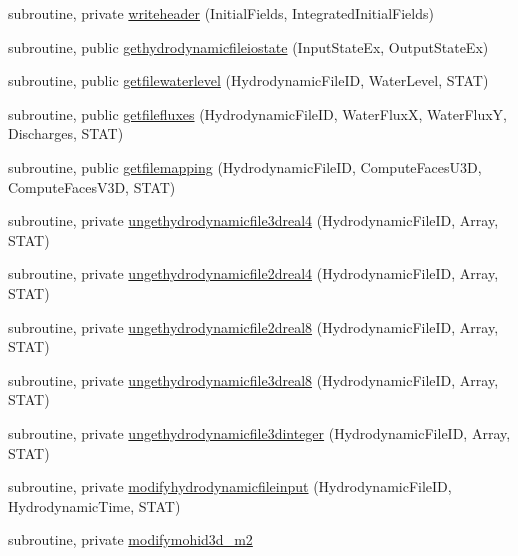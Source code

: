 \begin{DoxyCompactItemize}
\item 
subroutine, private \mbox{\hyperlink{namespacemodulehydrodynamicfile_ad777d9126fa56a82299811343a399ea8}{writeheader}} (Initial\+Fields, Integrated\+Initial\+Fields)
\item 
subroutine, public \mbox{\hyperlink{namespacemodulehydrodynamicfile_a8095cd04310d0ed954d72fb7021c5141}{gethydrodynamicfileiostate}} (Input\+State\+Ex, Output\+State\+Ex)
\item 
subroutine, public \mbox{\hyperlink{namespacemodulehydrodynamicfile_af996537253af14e50e63530e5814f6bb}{getfilewaterlevel}} (Hydrodynamic\+File\+ID, Water\+Level, S\+T\+AT)
\item 
subroutine, public \mbox{\hyperlink{namespacemodulehydrodynamicfile_a59c8f54e1b85d7dc3765167672866ffb}{getfilefluxes}} (Hydrodynamic\+File\+ID, Water\+FluxX, Water\+FluxY, Discharges, S\+T\+AT)
\item 
subroutine, public \mbox{\hyperlink{namespacemodulehydrodynamicfile_a9b237b5496d01afbf9b2c35f1ed0745c}{getfilemapping}} (Hydrodynamic\+File\+ID, Compute\+Faces\+U3D, Compute\+Faces\+V3D, S\+T\+AT)
\item 
subroutine, private \mbox{\hyperlink{namespacemodulehydrodynamicfile_a56a478bf1d00b0e9a1ea2795005d1b01}{ungethydrodynamicfile3dreal4}} (Hydrodynamic\+File\+ID, Array, S\+T\+AT)
\item 
subroutine, private \mbox{\hyperlink{namespacemodulehydrodynamicfile_a7f6d7c818b2355e29070b78957b71133}{ungethydrodynamicfile2dreal4}} (Hydrodynamic\+File\+ID, Array, S\+T\+AT)
\item 
subroutine, private \mbox{\hyperlink{namespacemodulehydrodynamicfile_a419f36beda63ccf38170844806ddd74c}{ungethydrodynamicfile2dreal8}} (Hydrodynamic\+File\+ID, Array, S\+T\+AT)
\item 
subroutine, private \mbox{\hyperlink{namespacemodulehydrodynamicfile_ac34af87bc19882352d63287997429ba6}{ungethydrodynamicfile3dreal8}} (Hydrodynamic\+File\+ID, Array, S\+T\+AT)
\item 
subroutine, private \mbox{\hyperlink{namespacemodulehydrodynamicfile_ac5cff7872d6994174eb551c203e0e56a}{ungethydrodynamicfile3dinteger}} (Hydrodynamic\+File\+ID, Array, S\+T\+AT)
\item 
subroutine, private \mbox{\hyperlink{namespacemodulehydrodynamicfile_a78cdd03605613d9ae76372179d4bb493}{modifyhydrodynamicfileinput}} (Hydrodynamic\+File\+ID, Hydrodynamic\+Time, S\+T\+AT)
\item 
subroutine, private \mbox{\hyperlink{namespacemodulehydrodynamicfile_aa54587d42d6b13c11895a1f934511d94}{modifymohid3d\+\_\+m2}}

\end{DoxyCompactItemize}
